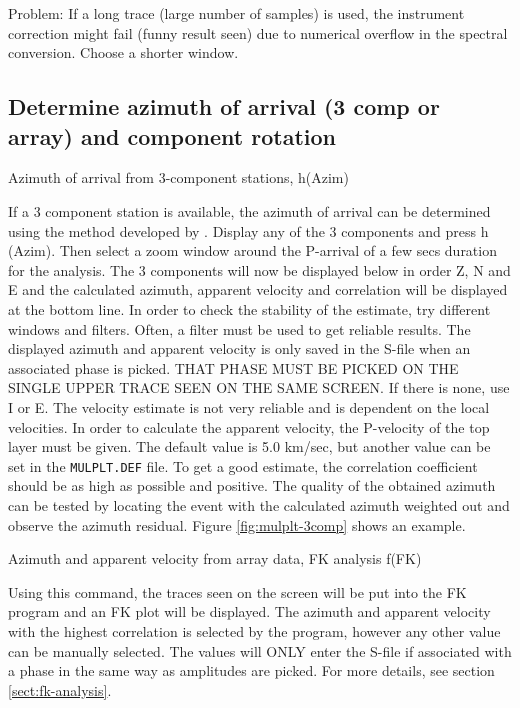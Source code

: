 Problem: If a long trace (large number of samples) is used, the instrument correction might fail (funny result seen) due to numerical overflow in the spectral conversion. Choose a shorter window.  

\subsection{Determine azimuth of arrival (3 comp or array) and component rotation}

Azimuth of arrival from 3-component stations, h(Azim) 

If a 3 component station is available, the azimuth of arrival can 
be determined using the method developed by \citet{roberts1989}. 
Display any of the 3 components and press h (Azim). Then select a 
zoom window around the P-arrival of a few secs duration for the 
analysis. The 3 components will now be displayed below in order Z, 
N and E and the calculated azimuth, apparent velocity and correlation 
will be displayed at the bottom line. In order to check the stability 
of the estimate, try different windows and filters. Often, a filter 
must be used to get reliable results. The displayed azimuth and 
apparent velocity is only saved in the S-file when an associated 
phase is picked. THAT PHASE MUST BE PICKED ON THE SINGLE UPPER 
TRACE SEEN ON THE SAME SCREEN. If there is none, use I or E. The 
velocity estimate is not very reliable and is dependent on the local 
velocities. In order to calculate the apparent velocity, the P-velocity 
of the top layer must be given. The default value is 5.0 km/sec, but 
another value can be set in the \texttt{MULPLT.DEF} file. To get a 
good estimate, the correlation coefficient should be as high as possible 
and positive. The quality of the obtained azimuth can be tested by 
locating the event with the calculated azimuth weighted out and observe the azimuth residual. 
Figure \ref{fig:mulplt-3comp}
shows an example.

Azimuth and apparent velocity from array data, FK analysis f(FK) 

Using this command, the traces seen on the screen will be put into the FK program and an FK plot will be displayed. The azimuth and apparent velocity with the highest correlation is selected by the program, however any other value can be manually selected. The values will ONLY enter the S-file if associated with a phase in the same way as amplitudes are picked. For more details, see section \ref{sect:fk-analysis}.

